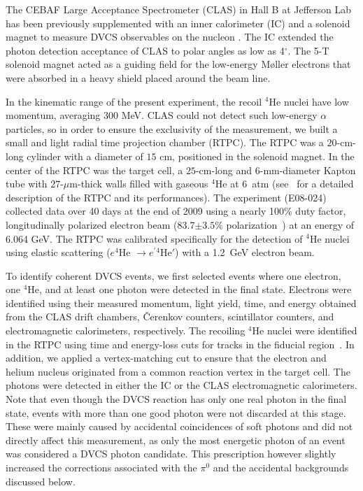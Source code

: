 \documentclass[twocolumn,nofootinbib,showpacs,prl,superscriptaddress,secnumarabic,amssymb,nobibnotes,aps,floatfix]{revtex4}
\begin{document}
The CEBAF Large Acceptance Spectrometer (CLAS) in Hall B at Jefferson 
Lab~\cite{Mecking:2003zu} has been previously supplemented with an inner 
calorimeter (IC) and a solenoid magnet to measure DVCS observables on the nucleon
\cite{Girod:2007aa,Gavalian:2009,Seder:2015,Pisano:2015,Jo:2015ema}. The IC 
extended the photon detection acceptance of CLAS to polar angles as low as 
4$^{\circ}$. The 5-T solenoid magnet acted as a guiding field for the 
low-energy M\o{}ller electrons that were absorbed in a  
heavy shield placed around the beam line. 

In the kinematic range of the present experiment, the recoil $^4$He nuclei 
have low momentum, averaging 300 MeV. CLAS could not detect such low-energy $\alpha$ 
particles, so in order to ensure the exclusivity of the measurement, we built a 
small and light radial time projection chamber (RTPC). The 
RTPC was a $20$-cm-long cylinder with a diameter of $15$ cm, positioned in the 
solenoid magnet. In the center of the RTPC was the target cell, a $25$-cm-long 
and $6$-mm-diameter Kapton tube with $27$-$\mu$m-thick walls filled with 
gaseous $^4$He at 6~atm (see~\cite{Dupre:2017upj} for a detailed description of 
the RTPC and its performances). The experiment (E08-024)~\cite{Hafidi:2008pr} collected
data over 40 days at the end of 2009 using a 
nearly 100\% duty factor, longitudinally polarized electron beam (83.7$\pm 3.5 \%$ 
polarization~\cite{Perrin:thesis}) at an energy of 6.064 GeV. The RTPC was calibrated specifically 
for the detection of $^4$He nuclei using elastic scattering 
($e^4$He $\to e^\prime$$^4$He$'$) with a 1.2~GeV electron beam.
 
To identify coherent DVCS events, we first selected events where one electron, 
one $^4$He, and at least one photon were detected in the final state. Electrons 
were identified using their measured momentum, light yield, time, and energy obtained from 
the CLAS drift chambers, \v{C}erenkov counters, scintillator counters, 
and electromagnetic calorimeters, respectively. The recoiling $^4$He nuclei 
were identified in the RTPC using time and energy-loss cuts for tracks in the 
fiducial region~\cite{Hattawy:thesis}. In addition, we applied a vertex-matching 
cut to ensure that the 
electron and helium nucleus originated from a common reaction vertex in the 
target cell. The photons were 
detected in either the IC or the CLAS electromagnetic calorimeters. Note that 
even though the DVCS reaction has only one real photon in the final state, 
events with more than one good photon were not discarded at this stage. These
were mainly caused by accidental coincidences of soft photons and did not directly
affect this measurement, as only the most energetic photon of an 
event was considered a DVCS photon candidate.
This prescription however slightly increased the corrections associated with
the $\pi^0$ and the accidental backgrounds discussed below. 
\end{document}
